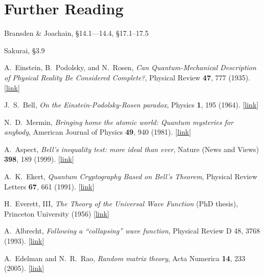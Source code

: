 \documentclass[prx,12pt]{revtex4-2}
\begin{document}
\section*{Further Reading}

\begin{enumerate}[[1{]}]
\item Bransden \& Joachain, \S14.1---14.4, \S17.1--17.5

\item Sakurai, \S3.9

\item A.~Einstein, B.~Podolsky, and N.~Rosen,
  \textit{Can Quantum-Mechanical Description of Physical Reality Be
    Considered Complete?}, Physical Review \textbf{47}, 777 (1935).
  [\href{https://journals.aps.org/pr/abstract/10.1103/PhysRev.47.777}{link}]
  \label{cite:epr}

\item J.~S.~Bell, \textit{On the Einstein-Podolsky-Rosen paradox},
  Physics \textbf{1}, 195 (1964). [\href{http://inspirehep.net/record/31657/files/}{link}]\label{cite:bell}
  
\item N.~D.~Mermin, \textit{Bringing home the atomic world: Quantum
  mysteries for anybody}, American Journal of Physics \textbf{49}, 940
  (1981). [\href{http://aapt.scitation.org/doi/abs/10.1119/1.12594}{link}] \label{cite:mermin}

\item A.~Aspect, \textit{Bell's inequality test: more ideal than ever},
  Nature (News and Views) \textbf{398}, 189 (1999). [\href{https://www.nature.com/articles/18296}{link}] \label{cite:aspect}

\item A.~K.~Ekert, \textit{Quantum Cryptography Based on Bell's Theorem},
  Physical Review Letters \textbf{67}, 661 (1991). [\href{https://journals.aps.org/prl/abstract/10.1103/PhysRevLett.67.661}{link}] \label{cite:ekert}

  
\item H.~Everett, III, \textit{The Theory of the Universal Wave
  Function} (PhD thesis), Princeton University (1956)
  [\href{http://ucispace.lib.uci.edu/handle/10575/1302}{link}]
\label{cite:everett}

\item A.~Albrecht, \textit{Following a ``collapsing'' wave function},
  Physical Review D \textrm{48}, 3768 (1993). [\href{https://journals.aps.org/prd/abstract/10.1103/PhysRevD.48.3768}{link}]
\label{cite:albrecht}

\item A.~Edelman and N.~R.~Rao, \textit{Random matrix theory}, Acta
  Numerica \textbf{14}, 233 (2005). [\href{https://doi.org/10.1017/S0962492904000236}{link}]
\label{cite:edelman}
\end{enumerate}
\end{document}
